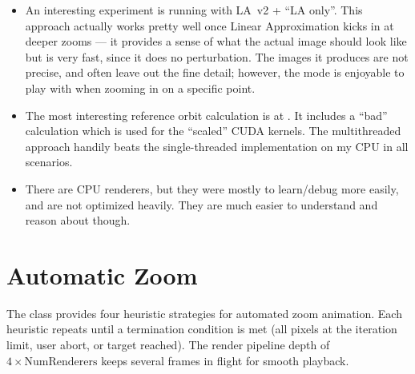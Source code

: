 \begin{itemize}
\item An interesting experiment is running with LA~v2 + ``LA only''. This 
approach actually works pretty well once Linear Approximation kicks in at 
deeper zooms --- it provides a sense of what the actual image should look like 
but is very fast, since it does no perturbation. The images it produces are not 
precise, and often leave out the fine detail; however, the mode is enjoyable to play with 
when zooming in on a specific point.

\item The most interesting reference orbit calculation is at
. It includes a ``bad'' calculation
which is used for the ``scaled'' CUDA kernels. The multithreaded approach
handily beats the single-threaded implementation on my CPU in all scenarios.

\item There are CPU renderers, but they were mostly to learn/debug more easily, 
and are not optimized heavily. They are much easier to understand and reason 
about though.
\end{itemize}

\section{Automatic Zoom}
\label{subsec:autozoom}

The  class provides four heuristic strategies for
automated zoom animation.  Each heuristic repeats until a termination
condition is met (all pixels at the iteration limit, user abort, or
target reached).  The render pipeline depth of
$4 \times \text{NumRenderers}$ keeps several frames in flight for smooth
playback.

